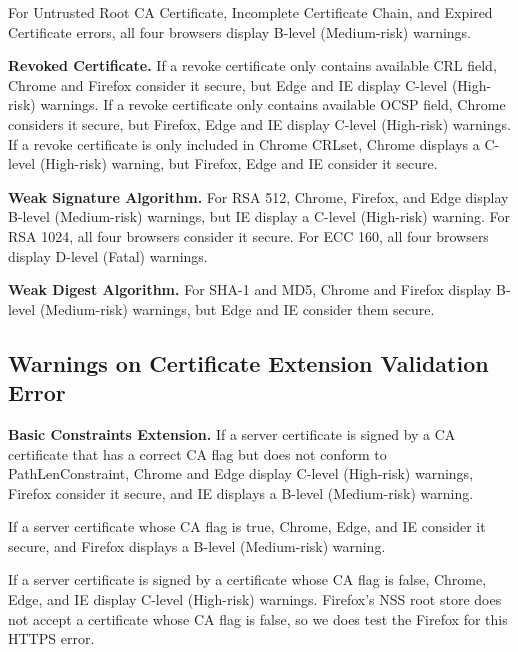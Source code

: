     For Untrusted Root CA Certificate, Incomplete Certificate Chain, and Expired Certificate errors,
        all four browsers display B-level (Medium-risk) warnings.

\textbf{Revoked Certificate.}
    If a revoke certificate only contains available CRL field,
        Chrome and Firefox consider it secure,
            but Edge and IE display C-level (High-risk) warnings.
    If a revoke certificate only contains available OCSP field,
        Chrome considers it secure, but Firefox,
            Edge and IE display C-level (High-risk) warnings.
    If a revoke certificate is only included in Chrome CRLset,
        Chrome displays a C-level (High-risk) warning,
            but Firefox, Edge and IE consider it secure.

\textbf{Weak Signature Algorithm.}
    For RSA 512,
        Chrome, Firefox, and Edge display B-level (Medium-risk) warnings,
            but IE display a C-level (High-risk) warning.
    For RSA 1024,
        all four browsers consider it secure.
    For ECC 160,
        all four browsers display D-level (Fatal) warnings.

\textbf{Weak Digest Algorithm.}
    For SHA-1 and MD5,
        Chrome and Firefox display B-level (Medium-risk) warnings,
            but Edge and IE consider them secure.

\subsection{Warnings on Certificate Extension Validation Error}

\textbf{Basic Constraints Extension.}
    If a server certificate is signed by a CA certificate that has a correct CA flag but does not conform to PathLenConstraint, 
    Chrome and Edge display C-level (High-risk) warnings,
    Firefox consider it secure, and IE displays a B-level (Medium-risk) warning.
    
    If a server certificate whose CA flag is true, 
    Chrome, Edge, and IE consider it secure,
    and Firefox displays a B-level (Medium-risk) warning.
    
    If a server certificate is signed by a certificate whose CA flag is false, 
     Chrome, Edge, and IE display C-level (High-risk) warnings.
     Firefox's NSS root store does not accept a certificate whose CA flag is false, so we does test the Firefox for this HTTPS error.
     
